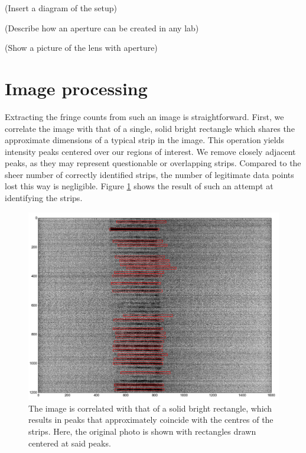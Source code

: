 \documentclass[11.5pt]{book}
\begin{document}
(Insert a diagram of the setup)

(Describe how an aperture can be created in any lab)

(Show a picture of the lens with aperture)

\section{Image processing}
\label{sec:ipi-slitprocessing}
Extracting the fringe counts from such an image is straightforward. First, we
correlate the image with that of a single, solid bright rectangle which shares
the approximate dimensions of a typical strip in the image. This operation
yields intensity
peaks centered over our regions of interest. We remove closely adjacent peaks,
as they may represent questionable or overlapping strips. Compared to the sheer
number of correctly identified strips, the number of legitimate data points lost
this way is negligible. Figure \ref{fig:globalsizing-identifystrips} shows the
result of such an attempt at identifying the strips.

\begin{figure}[h]
    \centering
    \includegraphics[height=0.38\textheight]{img/globalsizing-identifystrips.png}
    \caption{The image is correlated with that of a solid bright rectangle, which
        results in peaks that approximately coincide with the centres of the
        strips. Here, the original photo is shown with rectangles drawn centered
    at said peaks.}
    \label{fig:globalsizing-identifystrips}
\end{figure}
\end{document}
